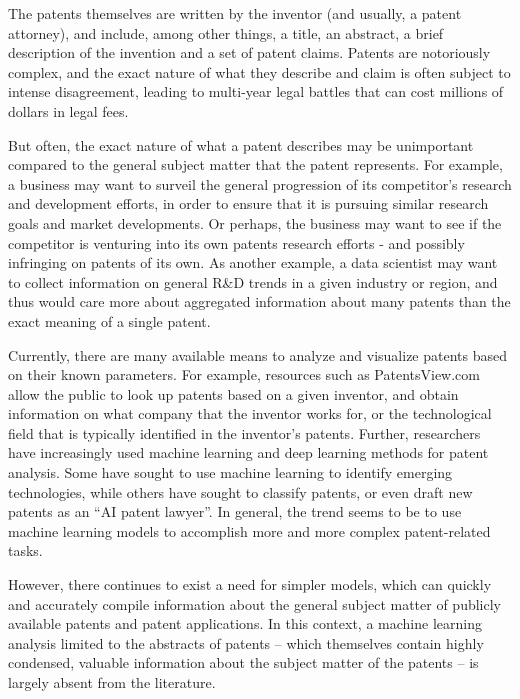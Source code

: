 \documentclass{article}
\begin{document}
The patents themselves are written by the inventor (and usually, a patent attorney), and include, among other things, a title, an abstract, a brief description of the invention and a set of patent claims\cite{website:patent1}.   Patents are notoriously complex, and the exact nature of what they describe and claim is often subject to intense disagreement, leading to multi-year legal battles that can cost millions of dollars in legal fees\cite{website:aipla}.

But often, the exact nature of what a patent describes may be unimportant compared to the general subject matter that the patent represents. For example, a business may want to surveil the general progression of its competitor’s research and development efforts, in order to ensure that it is pursuing similar research goals and market developments. Or perhaps, the business may want to see if the competitor is venturing into its own patents research efforts - and possibly infringing on patents of its own. As another example, a data scientist may want to collect information on general R\&D trends in a given industry or region, and thus would care more about aggregated information about many patents than the exact meaning of a single patent.

Currently, there are many available means to analyze and visualize patents based on their known parameters.  For example, resources such as PatentsView.com allow the public to look up patents based on a given inventor, and obtain information on what company that the inventor works for, or the technological field that is typically identified in the inventor’s patents.  Further, researchers have increasingly used machine learning and deep learning methods for patent analysis.  Some have sought to use machine learning to identify emerging technologies\cite{website:nbsd}, while others have sought to classify patents\cite{website:nbsd2}, or even draft new patents as an “AI patent lawyer”\cite{website:nbsd3}.  In general, the trend seems to be to use machine learning models to accomplish more and more complex patent-related tasks.

However, there continues to exist a need for simpler models, which can quickly and accurately compile information about the general subject matter of publicly available patents and patent applications.  In this context, a machine learning analysis limited to the abstracts of patents – which themselves contain highly condensed, valuable information about the subject matter of the patents – is largely absent from the literature.
\label{background}
\end{document}
